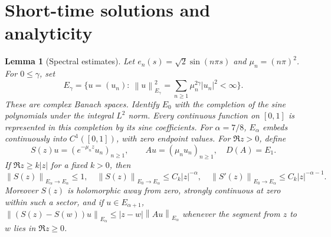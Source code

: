 \documentclass[11pt]{article}
\newtheorem{lemma}[theorem]{Lemma}
\newcommand{\norm}[1]{\left\lVert#1\right\rVert}
\begin{document}
\section{Short-time solutions and analyticity}
\begin{lemma}[Spectral estimates]\label{lem:spectral}
Let $e_n(s)=\sqrt2\sin(n\pi s)$ and $\mu_n=(n\pi)^2$.
For $0\le\gamma$, set
\[
 E_\gamma=\{u=(u_n):\ \norm{u}_{E_\gamma}^2
             =\sum_{n\ge1}\mu_n^{2\gamma}|u_n|^2<\infty\}.
\]
These are complex Banach spaces. Identify $E_0$ with the completion of
the sine polynomials under the integral $L^2$ norm. Every continuous
function on $[0,1]$ is represented in this completion by its sine
coefficients. For $\alpha=7/8$, $E_\alpha$ embeds continuously into
$C^1([0,1])$, with zero endpoint values. For $\Re z>0$, define
\[
 S(z)u=(e^{-\mu_n z}u_n)_{n\ge1},\qquad
 Au=(\mu_nu_n)_{n\ge1},\quad D(A)=E_1.
\]
If $\Re z\ge k|z|$ for a fixed $k>0$, then
\[
 \norm{S(z)}_{E_\alpha\to E_\alpha}\le1,\quad
 \norm{S(z)}_{E_0\to E_\alpha}\le C_k|z|^{-\alpha},\quad
 \norm{S'(z)}_{E_0\to E_\alpha}\le C_k|z|^{-\alpha-1}. \tag{2}
\]
Moreover $S(z)$ is holomorphic away from zero, strongly continuous
at zero within such a sector, and if $u\in E_{\alpha+1}$,
$\norm{(S(z)-S(w))u}_{E_\alpha}\le |z-w|\norm{Au}_{E_\alpha}$
whenever the segment from $z$ to $w$ lies in $\Re z\ge0$.
\end{lemma}
\end{document}
